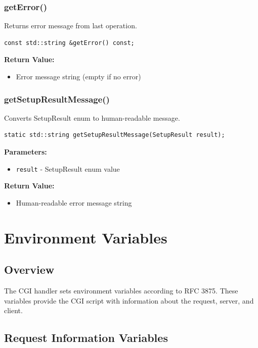 \documentclass[11pt,a4paper]{article}
\begin{document}
\subsubsection{getError()}

Returns error message from last operation.

\begin{lstlisting}[caption=getError() Method]
const std::string &getError() const;
\end{lstlisting}

\textbf{Return Value:}
\begin{itemize}
    \item Error message string (empty if no error)
\end{itemize}

\subsubsection{getSetupResultMessage()}

Converts SetupResult enum to human-readable message.

\begin{lstlisting}[caption=getSetupResultMessage() Static Method]
static std::string getSetupResultMessage(SetupResult result);
\end{lstlisting}

\textbf{Parameters:}
\begin{itemize}
    \item \texttt{result} - SetupResult enum value
\end{itemize}

\textbf{Return Value:}
\begin{itemize}
    \item Human-readable error message string
\end{itemize}

\newpage
\section{Environment Variables}

\subsection{Overview}

The CGI handler sets environment variables according to RFC 3875. These variables provide the CGI script with information about the request, server, and client.

\subsection{Request Information Variables}
\end{document}
